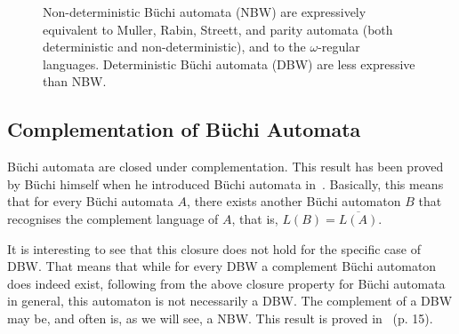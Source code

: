 \documentclass{scrreprt}
\newcommand{\om}{{$\omega$}}
\begin{document}
\begin{figure}[htb]
\begin{center}
\caption{Non-deterministic Büchi automata (NBW) are expressively equivalent to Muller, Rabin, Streett, and parity automata (both deterministic and non-deterministic), and to the \om-regular languages. Deterministic Büchi automata (DBW) are less expressive than NBW.}
\label{equivalences}
\end{center}
\end{figure}


\subsection{Complementation of Büchi Automata}
Büchi automata are closed under complementation. This result has been proved by Büchi himself when he introduced Büchi automata in~\cite{buchi1960decision}. Basically, this means that for every Büchi automata $A$, there exists another Büchi automaton $B$ that recognises the complement language of $A$, that is, $L(B) = \overline{L(A)}$.

It is interesting to see that this closure does not hold for the specific case of DBW. That means that while for every DBW a complement Büchi automaton does indeed exist, following from the above closure property for Büchi automata in general, this automaton is not necessarily a DBW. The complement of a DBW may be, and often is, as we will see, a NBW. This result is proved in~\cite{Thomas:1991} (p. 15).
\end{document}
